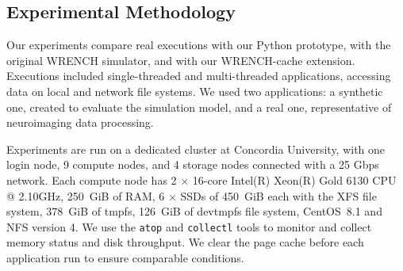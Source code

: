 \documentclass[conference]{IEEEtran}
\newcommand{\wrench}{WRENCH\xspace}
\begin{document}
        \subsection{Experimental Methodology}




        Our experiments compare real executions with our Python prototype,
        with the original \wrench simulator, and with our \wrench-cache
        extension. Executions included single-threaded and multi-threaded
        applications, accessing data on local and network file systems. We
        used two applications: a synthetic one, created to evaluate the
        simulation model, and a real one, representative of neuroimaging
        data processing.

        Experiments are run on a dedicated cluster at
        Concordia University, with one login node, 9 compute nodes, and 4
        storage nodes connected with a 25 Gbps network. Each
        compute node has 2 $\times$ 16-core Intel(R) Xeon(R) Gold 6130 CPU
        @ 2.10GHz, 250~GiB of RAM, 6 $\times$ SSDs of 450~GiB each with the XFS
        file system, 378~GiB of tmpfs, 126~GiB of devtmpfs file system,
        CentOS~8.1 and NFS version 4. We use the \texttt{atop}
        and \texttt{collectl} tools to monitor and collect memory status
        and disk throughput. We clear the page
        cache before each application run to ensure comparable
        conditions.
\end{document}
